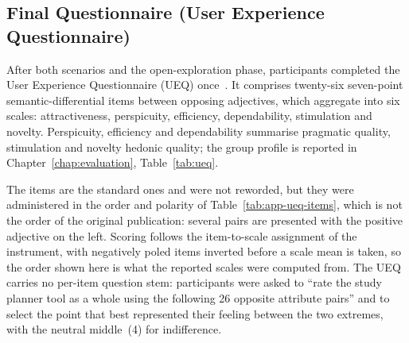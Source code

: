 \subsection{Final Questionnaire (User Experience Questionnaire)}
\label{app:eval-ueq}

After both scenarios and the open-exploration phase, participants completed the User Experience Questionnaire (UEQ) once~\cite{laugwitz_construction_2008}. It comprises twenty-six seven-point semantic-differential items between opposing adjectives, which aggregate into six scales: attractiveness, perspicuity, efficiency, dependability, stimulation and novelty. Perspicuity, efficiency and dependability summarise pragmatic quality, stimulation and novelty hedonic quality; the group profile is reported in Chapter~\ref{chap:evaluation}, Table~\ref{tab:ueq}.

The items are the standard ones and were not reworded, but they were administered in the order and polarity of Table~\ref{tab:app-ueq-items}, which is not the order of the original publication: several pairs are presented with the positive adjective on the left. Scoring follows the item-to-scale assignment of the instrument, with negatively poled items inverted before a scale mean is taken, so the order shown here is what the reported scales were computed from. The UEQ carries no per-item question stem: participants were asked to \enquote{rate the study planner tool as a whole using the following 26 opposite attribute pairs} and to select the point that best represented their feeling between the two extremes, with the neutral middle~(4) for indifference.

